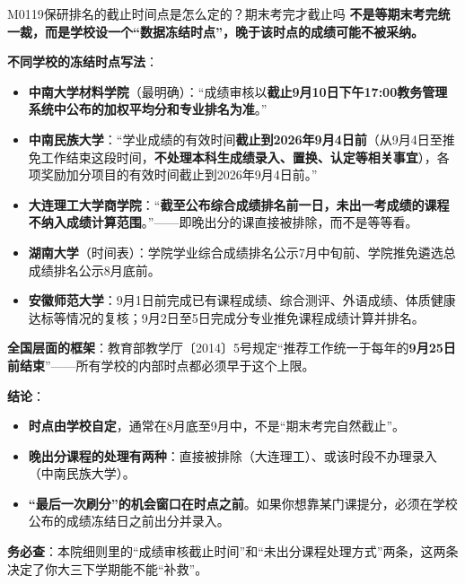 \begin{qa}{M0119}{保研排名的截止时间点是怎么定的？期末考完才截止吗}
\textbf{不是等期末考完统一裁，而是学校设一个“数据冻结时点”，晚于该时点的成绩可能不被采纳。}

\textbf{不同学校的冻结时点写法}：

\begin{itemize}
  \item \textbf{中南大学材料学院}（最明确）：“成绩审核以\textbf{截止9月10日下午17:00教务管理系统中公布的加权平均分和专业排名为准}。”
  \item \textbf{中南民族大学}：“学业成绩的有效时间\textbf{截止到2026年9月4日前}（从9月4日至推免工作结束这段时间，\textbf{不处理本科生成绩录入、置换、认定等相关事宜}），各项奖励加分项目的有效时间截止到2026年9月4日前。”
  \item \textbf{大连理工大学商学院}：“\textbf{截至公布综合成绩排名前一日，未出一考成绩的课程不纳入成绩计算范围}。”——即晚出分的课直接被排除，而不是等等看。
  \item \textbf{湖南大学}（时间表）：学院学业综合成绩排名公示7月中旬前、学院推免遴选总成绩排名公示8月底前。
  \item \textbf{安徽师范大学}：9月1日前完成已有课程成绩、综合测评、外语成绩、体质健康达标等情况的复核；9月2日至5日完成分专业推免课程成绩计算并排名。
\end{itemize}

\textbf{全国层面的框架}：教育部教学厅〔2014〕5号规定“推荐工作统一于每年的\textbf{9月25日前结束}”——所有学校的内部时点都必须早于这个上限。

\textbf{结论}：
\begin{itemize}
  \item \textbf{时点由学校自定}，通常在8月底至9月中，不是“期末考完自然截止”。
  \item \textbf{晚出分课程的处理有两种}：直接被排除（大连理工）、或该时段不办理录入（中南民族大学）。
  \item \textbf{“最后一次刷分”的机会窗口在时点之前}。如果你想靠某门课提分，必须在学校公布的成绩冻结日之前出分并录入。
\end{itemize}

\textbf{务必查}：本院细则里的“成绩审核截止时间”和“未出分课程处理方式”两条，这两条决定了你大三下学期能不能“补救”。
\end{qa}

